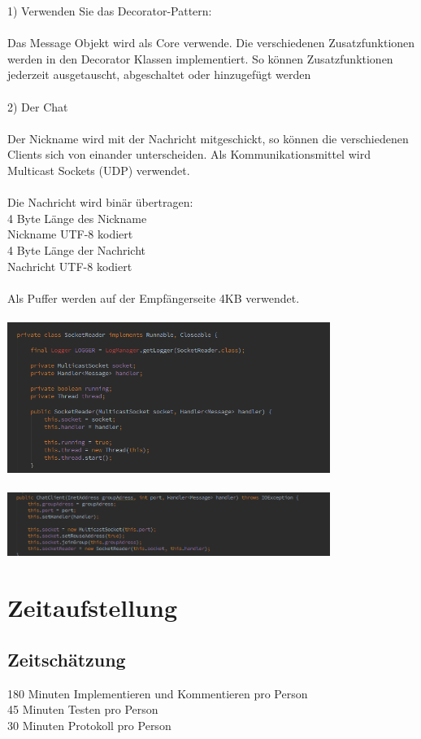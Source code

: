 \documentclass[a4paper, 11pt]{article}
\begin{document}
1) Verwenden Sie das Decorator-Pattern:
\\\\
Das Message Objekt wird als Core verwende.
Die verschiedenen Zusatzfunktionen werden in den Decorator Klassen implementiert. So können Zusatzfunktionen jederzeit ausgetauscht, abgeschaltet oder hinzugefügt werden
\\\\
2) Der Chat
\\\\
Der Nickname wird mit der Nachricht mitgeschickt, so können die verschiedenen Clients sich von einander unterscheiden. Als Kommunikationsmittel wird Multicast Sockets (UDP) verwendet.
\\\\
Die Nachricht wird binär übertragen:\\
4 Byte Länge des Nickname\\
Nickname UTF-8 kodiert\\
4 Byte Länge der Nachricht\\
Nachricht UTF-8 kodiert
\\\\
Als Puffer werden auf der Empfängerseite 4KB verwendet.
\\\\
\includegraphics[width=10.5cm]{socketr}
\\\\
\includegraphics[width=10.5cm]{socketimp}

\section{Zeitaufstellung}

\subsection{Zeitschätzung}
180 Minuten Implementieren und Kommentieren pro Person\\
45 Minuten Testen pro Person\\
30 Minuten Protokoll pro Person
\end{document}
